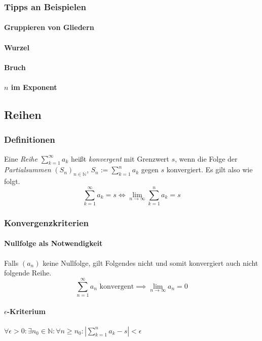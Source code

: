 \documentclass[a4paper, 9pt, DIV=24]{scrartcl}
\newcommand{\N}{\mathbb{N}}
\begin{document}
\subsubsection{Tipps an Beispielen}
\paragraph{Gruppieren von Gliedern}

\paragraph{Wurzel}

\paragraph{Bruch}

\paragraph{$n$ im Exponent}

\subsection{Reihen}
\subsubsection{Definitionen}
Eine \emph{Reihe} $\sum_{k = 1}^\infty a_k$ heißt \emph{konvergent} mit Grenzwert $s$, wenn die Folge der \emph{Partialsummen}
$(S_n)_{n \in \N}$, $S_n := \sum_{k=1}^n a_k$ gegen $s$ konvergiert. Es gilt also wie folgt.
\[ \sum_{k=1}^\infty a_k = s \iff \lim_{n\to\infty} \sum_{k=1}^n a_k = s \]

\subsubsection{Konvergenzkriterien}

\paragraph{Nullfolge als Notwendigkeit}
Falls $(a_n)$ keine Nullfolge, gilt Folgendes nicht und somit konvergiert auch nicht folgende Reihe.
\[ \sum_{n=1}^\infty a_n \text{ konvergent} \implies \lim_{n \to \infty} a_n = 0 \]

\paragraph{$\epsilon$-Kriterium}
$\forall \epsilon > 0: \exists n_0 \in \N: \forall n \geq n_0: | \sum_{k=1}^n a_k - s | < \epsilon$
\end{document}
